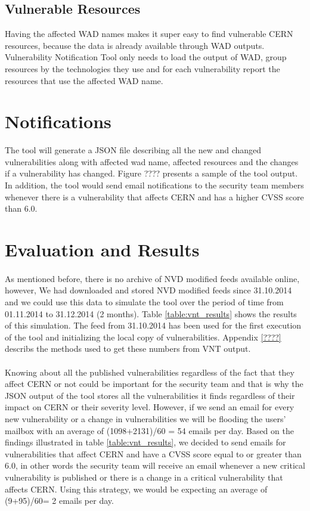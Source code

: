 {{\subsection{Vulnerable Resources}
Having the affected WAD names makes it super easy to find vulnerable CERN resources, because the data is already available through WAD outputs. Vulnerability Notification Tool only needs to load the output of WAD, group resources by the technologies they use and for each vulnerability report the resources that use the affected WAD name. 
\section{Notifications}
The tool will generate a JSON file describing all the new and changed vulnerabilities along with affected wad name, affected resources and the changes if a vulnerability has changed. Figure ???? presents a sample of the tool output. 
In addition, the tool would send email notifications to the security team members whenever there is a vulnerability that affects CERN and has a higher CVSS score than 6.0. 


\section{Evaluation and Results}

\paragraph{}
As mentioned before, there is no archive of NVD modified feeds available online, however, We had downloaded and stored NVD modified feeds since 31.10.2014 and we could use this data to simulate the tool over the period of time from 01.11.2014 to 31.12.2014 (2 months). Table \ref{table:vnt_results} shows the results of this simulation. The feed from 31.10.2014 has been used for the first execution of the tool and initializing the local copy of vulnerabilities. Appendix \ref{????} describs the methods used to get these numbers from VNT output.
\paragraph{}
Knowing about all the published vulnerabilities regardless of the fact that they affect CERN or not could be important for the security team and that is why the JSON output of the tool stores all the vulnerabilities it finds regardless of their impact on CERN or their severity level. However, if we send an email for every new vulnerability or a change in vulnerabilities we will be flooding the users' mailbox with an average of (1098+2131)/60 = 54 emails per day. Based on the findings illustrated in table \ref{table:vnt_results}, we decided to send emails for vulnerabilities that affect CERN and have a CVSS score equal to or greater than 6.0, in other words the security team will receive an email whenever a new critical vulnerability is published or there is a change in a critical vulnerability that affects CERN. Using this strategy, we would be expecting an average of (9+95)/60= 2 emails per day. 
}}
